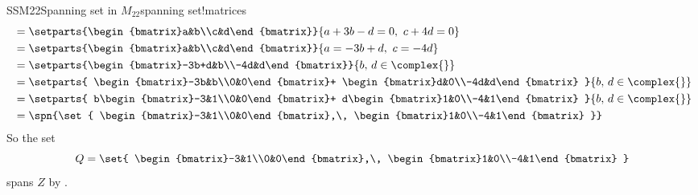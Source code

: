 \begin{example}{SSM22}{Spanning set in $M_{22}$}{spanning set!matrices}
\begin{align*}
&=\setparts{\begin{bmatrix}a&b\\c&d\end{bmatrix}}{a+3b-d=0,\ c+4d=0}\\
&=\setparts{\begin{bmatrix}a&b\\c&d\end{bmatrix}}{a=-3b+d,\ c=-4d}\\
&=\setparts{\begin{bmatrix}-3b+d&b\\-4d&d\end{bmatrix}}{b,\,d\in\complex{\null}}\\
%
&=\setparts{
\begin{bmatrix}-3b&b\\0&0\end{bmatrix}+
\begin{bmatrix}d&0\\-4d&d\end{bmatrix}
}{b,\,d\in\complex{\null}}\\
%
&=\setparts{
b\begin{bmatrix}-3&1\\0&0\end{bmatrix}+
d\begin{bmatrix}1&0\\-4&1\end{bmatrix}
}{b,\,d\in\complex{\null}}\\
%
&=\spn{\set{
\begin{bmatrix}-3&1\\0&0\end{bmatrix},\,
\begin{bmatrix}1&0\\-4&1\end{bmatrix}
}}
%
\end{align*}
%
So the set 
%
\begin{equation*}
Q=\set{
\begin{bmatrix}-3&1\\0&0\end{bmatrix},\,
\begin{bmatrix}1&0\\-4&1\end{bmatrix}
}
\end{equation*}
%
spans $Z$ by .
%
\end{example}
%
%

